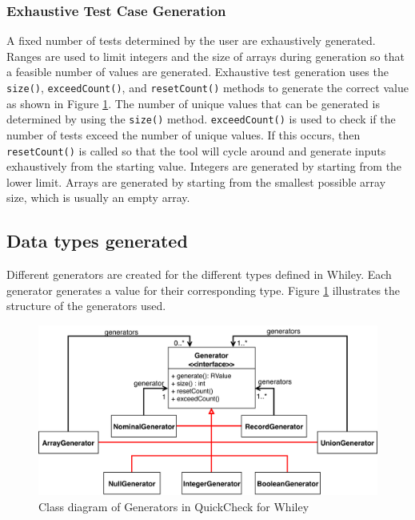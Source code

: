 \subsubsection{Exhaustive Test Case Generation}
A fixed number of tests determined by the user are exhaustively generated. Ranges are used to limit integers and the size of arrays during generation so that a feasible number of values are generated. 
Exhaustive test generation uses the \texttt{size()}, \texttt{exceedCount()}, and \texttt{resetCount()} methods to generate the correct value as shown in Figure \ref{fig:qc-generators}.
The number of unique values that can be generated is determined by using the \texttt{size()} method.
\texttt{exceedCount()} is used to check if the number of tests exceed the number of unique values. If this occurs, then \texttt{resetCount()} is called so that the tool will cycle around and generate inputs exhaustively from the starting value. 
Integers are generated by starting from the lower limit. Arrays are generated by starting from the smallest possible array size, which is usually an empty array. 

\subsection{Data types generated}
Different generators are created for the different types defined in Whiley. Each generator generates a value for their corresponding type.
Figure \ref{fig:qc-generators} illustrates the structure of the generators used.
 
\begin{figure}
	\includegraphics[width=\textwidth]{qc-generators}
	\caption{Class diagram of Generators in QuickCheck for Whiley}
	\label{fig:qc-generators}
	\centering
\end{figure}


